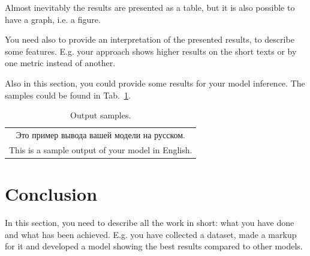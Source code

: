 \documentclass{article}
\begin{document}
Almost inevitably the results are presented as a table, but it is also possible to have a graph, i.e. a figure.

You need also to provide an interpretation of the presented results, to describe some features. E.g. your approach shows higher results on the short texts or by one metric instead of another.

Also in this section, you could provide some results for your model inference. The samples could be found in Tab.~\ref{tab:output}.

\begin{table}[!tbh]
    \centering
    \begin{tabular}{|c|}
\hline
Это пример вывода вашей модели на русском.\\
This is a sample output of your model in English.
\\
\hline
    \end{tabular}
    \caption{Output samples.}
    \label{tab:output}
\end{table}

\section{Conclusion}
In this section, you need to describe all the work in short: what you have done and what has been achieved. E.g. you have collected a dataset, made a markup for it and developed a model showing the best results compared to other models. 



\end{document}
